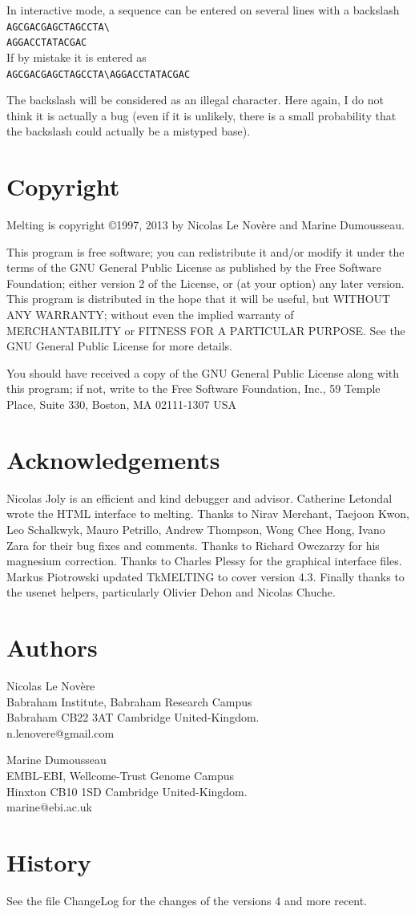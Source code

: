 \documentclass{article}
\begin{document}
In interactive mode, a sequence can be entered on several lines with a backslash\\
\texttt{AGCGACGAGCTAGCCTA{\textbackslash}\\
AGGACCTATACGAC}\\
If by mistake it is entered as  \\
\texttt{AGCGACGAGCTAGCCTA{\textbackslash}{}AGGACCTATACGAC}

The backslash will be considered 
 as an illegal character. Here again, I do not think it is actually a bug 
(even if it is unlikely, there is a small probability that the  backslash 
could actually be a mistyped base).   
   
\section{Copyright }
Melting is copyright 
\copyright 1997, 2013 by Nicolas Le Nov\`ere and Marine Dumousseau.  

This program is free software; 
you can redistribute it and/or modify it under the terms of the GNU General 
Public License as published by the Free Software Foundation; either version 
2 of the License, or (at your option) any later version.   
  This program 
is distributed in the hope that it will be useful, but WITHOUT ANY WARRANTY; 
without even the implied warranty of MERCHANTABILITY or FITNESS FOR A 
PARTICULAR PURPOSE.  See the GNU General Public License for more details. 
  
  You should have received a copy of the GNU General Public License 
along with this program; if not, write to the Free Software Foundation, 
Inc., 59 Temple Place, Suite 330, Boston, MA  02111-1307 USA   
   
\section{Acknowledgements}
Nicolas Joly is an efficient and kind debugger and advisor.  Catherine
Letondal wrote the HTML interface to melting. Thanks to Nirav Merchant,
Taejoon Kwon, Leo Schalkwyk, Mauro Petrillo, Andrew Thompson, Wong Chee Hong, Ivano
Zara for their bug fixes and comments. Thanks to Richard Owczarzy for his magnesium 
correction. Thanks to Charles Plessy for the graphical interface files. Markus Piotrowski updated TkMELTING to cover version 4.3. Finally thanks
to the usenet helpers, particularly Olivier Dehon and Nicolas Chuche.

   
\section{Authors }
       Nicolas Le Novère\\
       Babraham Institute, Babraham Research Campus\\
       Babraham CB22 3AT Cambridge United-Kingdom.\\
       n.lenovere@gmail.com
       
       Marine Dumousseau\\
       EMBL-EBI, Wellcome-Trust Genome Campus\\
       Hinxton CB10 1SD Cambridge United-Kingdom. \\
       marine@ebi.ac.uk  

  
\section{History }

See the file ChangeLog for the changes of the versions 4 and more recent.
\end{document}
